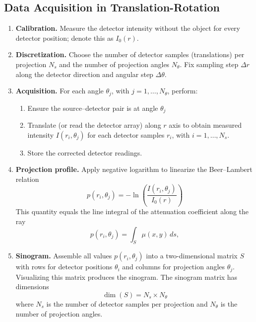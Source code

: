 \documentclass[../../../main.tex]{subfiles}
\begin{document}
\subsection{Data Acquisition in Translation-Rotation}
\begin{enumerate}
    \item \textbf{Calibration.} Measure the detector intensity without the object for every detector position; denote this as $I_0(r)$.
    \item \textbf{Discretization.} Choose the number of detector samples (translations) per projection $N_s$ and the number of projection angles $N_\theta$. Fix sampling step $\Delta r$ along the detector direction and angular step $\Delta \theta$.
    \item \textbf{Acquisition.} For each angle $\theta_j$, with $j=1,\dots,N_\theta$, perform:
          \begin{enumerate}
              \item Ensure the source–detector pair is at angle $\theta_j$
              \item Translate (or read the detector array) along $r$ axis to obtain measured intensity $I(r_i,\theta_j)$ for each detector samples $r_i$, with $i=1,\dots,N_s$.
              \item Store the corrected detector readings.
          \end{enumerate}
    \item \textbf{Projection profile.} Apply negative logarithm to linearize the Beer–Lambert relation
          \begin{equation*}
              p(r_i,\theta_j)=-\ln \left( \frac{I(r_i,\theta_j)}{I_0(r)} \right)
          \end{equation*}
          This quantity equals the line integral of the attenuation coefficient along the ray
          \begin{equation*}
              p(r_i,\theta_j)
              = \int_{S} \mu(x,y) \, ds,
          \end{equation*}
    \item \textbf{Sinogram.} Assemble all values $p(r_i,\theta_j)$ into a two-dimensional matrix $S$ with rows for detector positions $\theta_i$ and columns for projection angles $\theta_j$. Visualizing this matrix produces the sinogram. The sinogram matrix has dimensions
          \begin{equation*}
              \dim (S)=N_s\times N_\theta
          \end{equation*}
          where $N_s$ is the number of detector samples per projection and $N_\theta$ is the number of projection angles.
\end{enumerate}
\end{document}
